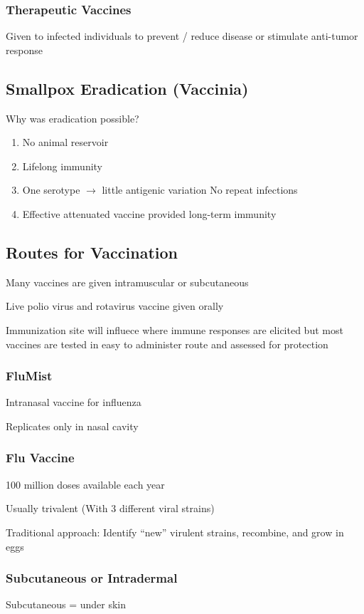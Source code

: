 \documentclass{notes}
\begin{document}
\subsubsection*{Therapeutic Vaccines}
Given to infected individuals to prevent / reduce disease or stimulate anti-tumor response

\subsection*{Smallpox Eradication (Vaccinia)}
Why was eradication possible?

\begin{enumerate}
    \item No animal reservoir
    \item Lifelong immunity
    \item One serotype \(\rightarrow\) little antigenic variation
    \subitem No repeat infections
    \item Effective attenuated vaccine provided long-term immunity
\end{enumerate}

\subsection*{Routes for Vaccination}
Many vaccines are given intramuscular or subcutaneous

\tab \indicates Live polio virus and rotavirus vaccine given orally

Immunization site will influece where immune responses are elicited but most vaccines are tested in easy to administer route and assessed for protection

\subsubsection*{FluMist}
Intranasal vaccine for influenza

Replicates only in nasal cavity

\subsubsection*{Flu Vaccine}
100 million doses available each year

Usually trivalent (With 3 different viral strains)

Traditional approach: Identify ``new'' virulent strains, recombine, and grow in eggs

\subsubsection*{Subcutaneous or Intradermal}
Subcutaneous = under skin
\end{document}
